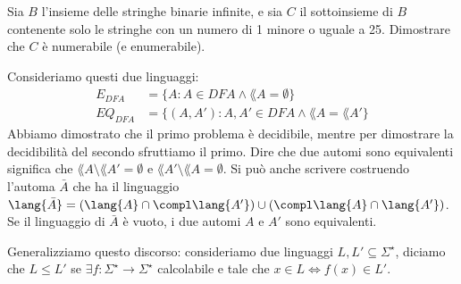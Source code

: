 \begin{esercizio}
	Sia $B$ l'insieme delle stringhe binarie infinite, e sia $C$ il sottoinsieme di $B$ contenente solo le stringhe con un numero di 1 minore o uguale a 25.
	Dimostrare che $C$ \`e numerabile (e enumerabile).
\end{esercizio}


Consideriamo questi due linguaggi:
\begin{align*}
	E_{DFA} & = \{ A : A \in DFA \land \lang{A} = \emptyset \} \\
	EQ_{DFA} & = \{ (A, A') : A, A' \in DFA \land \lang{A} = \lang{A'} \}
\end{align*}
Abbiamo dimostrato che il primo problema \`e decidibile, mentre per dimostrare la decidibilit\`a del secondo sfruttiamo il primo.
Dire che due automi sono equivalenti significa che $\lang{A} \setminus \lang{A'} = \emptyset$ e $\lang{A'} \setminus \lang{A} = \emptyset$.
Si pu\`o anche scrivere costruendo l'automa $\bar{A}$ che ha il linguaggio $\lang{\bar{A}} = \left( \lang{A} \cap \compl \lang{A'} \right) \cup \left( \compl \lang{A} \cap \lang{A'} \right)$.
Se il linguaggio di $\bar{A}$ \`e vuoto, i due automi $A$ e $A'$ sono equivalenti.

Generalizziamo questo discorso: consideriamo due linguaggi $L, L' \subseteq \Sigma^{\star}$, diciamo che $L \le L'$ se $\exists f : \Sigma^{\star} \to \Sigma^{\star}$ calcolabile e tale che $x \in L \iff f(x) \in L'$.


